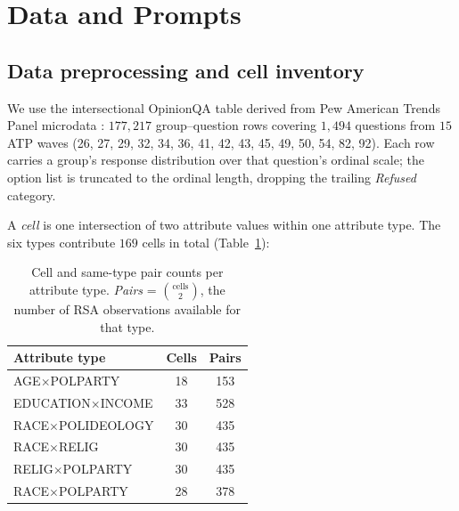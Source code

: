 \section{Data and Prompts}

\subsection{Data preprocessing and cell inventory}
\label{app:data}
We use the intersectional OpinionQA table derived from Pew American Trends
Panel microdata \citep{opinionqa2023, subpop2025}: $177{,}217$
group--question rows covering $1{,}494$ questions from $15$ ATP waves
(26, 27, 29, 32, 34, 36, 41, 42, 43, 45, 49, 50, 54, 82, 92). Each row
carries a group's response distribution over that question's ordinal
scale; the option list is truncated to the ordinal length, dropping the
trailing \textit{Refused} category.

A \emph{cell} is one intersection of two attribute values within one
attribute type. The six types contribute $169$ cells in total
(Table~\ref{tab:cellinventory}):

\begin{table}[t]
\centering
\begin{tabular}{lcc}
\toprule
Attribute type & Cells & Pairs \\
\midrule
AGE$\times$POLPARTY      & 18 & 153 \\
EDUCATION$\times$INCOME  & 33 & 528 \\
RACE$\times$POLIDEOLOGY  & 30 & 435 \\
RACE$\times$RELIG        & 30 & 435 \\
RELIG$\times$POLPARTY    & 30 & 435 \\
RACE$\times$POLPARTY     & 28 & 378 \\
\bottomrule
\end{tabular}
\caption{Cell and same-type pair counts per attribute type. \emph{Pairs}
= $\binom{\text{cells}}{2}$, the number of RSA observations available for
that type.}
\label{tab:cellinventory}
\end{table}

